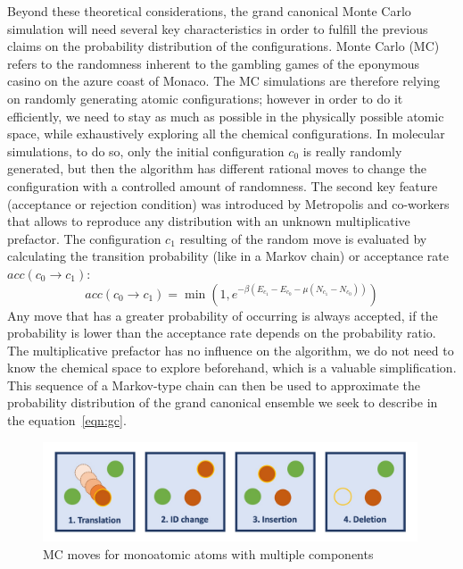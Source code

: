 \documentclass[main.tex]{subfiles}
\begin{document}
Beyond these theoretical considerations, the grand canonical Monte Carlo simulation will need several key characteristics in order to fulfill the previous claims on the probability distribution of the configurations. Monte Carlo (MC) refers to the randomness inherent to the gambling games of the eponymous casino on the azure coast of Monaco. The MC simulations are therefore relying on randomly generating atomic configurations; however in order to do it efficiently, we need to stay as much as possible in the physically possible atomic space, while exhaustively exploring all the chemical configurations. 
In molecular simulations, to do so, only the initial configuration $c_0$ is really randomly generated, but then the algorithm has different rational moves to change the configuration with a controlled amount of randomness. The second key feature (acceptance or rejection condition) was introduced by Metropolis and co-workers that allows to reproduce any distribution with an unknown multiplicative prefactor.\cite{Metropolis1949} The configuration $c_1$ resulting of the random move is evaluated by calculating the transition probability (like in a Markov chain) or acceptance rate $acc(c_0 \rightarrow c_1)$: 
\begin{equation}
  acc(c_0 \rightarrow c_1) = \min\left(1, e^{-\beta\left(E_{c_1}-E_{c_0}-\mu \left(N_{c_1}-N_{c_0}\right)\right) }\right)
\end{equation}
Any move that has a greater probability of occurring is always accepted, if the probability is lower than the acceptance rate depends on the probability ratio.
The multiplicative prefactor has no influence on the algorithm, we do not need to know the chemical space to explore beforehand, which is a valuable simplification. This sequence of a Markov-type chain can then be used to approximate the probability distribution of the grand canonical ensemble we seek to describe in the equation~\ref{eqn:gc}.


\begin{figure}[ht]
  \centering
  \includegraphics[width=0.99\textwidth]{figures/2-thermo/MC_moves.jpg}
  \caption{MC moves for monoatomic atoms with multiple components}\label{fgr:mc}
\end{figure}
\end{document}
